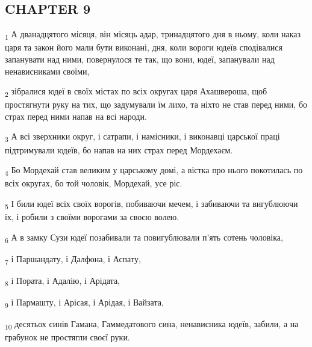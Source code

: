 \subsection{CHAPTER 9}
\begin{tcolorbox}
\textsubscript{1} А дванадцятого місяця, він місяць адар, тринадцятого дня в ньому, коли наказ царя та закон його мали бути виконані, дня, коли вороги юдеїв сподівалися запанувати над ними, повернулося те так, що вони, юдеї, запанували над ненависниками своїми,
\end{tcolorbox}
\begin{tcolorbox}
\textsubscript{2} зібралися юдеї в своїх містах по всіх округах царя Ахашвероша, щоб простягнути руку на тих, що задумували їм лихо, та ніхто не став перед ними, бо страх перед ними напав на всі народи.
\end{tcolorbox}
\begin{tcolorbox}
\textsubscript{3} А всі зверхники округ, і сатрапи, і намісники, і виконавці царської праці підтримували юдеїв, бо напав на них страх перед Мордехаєм.
\end{tcolorbox}
\begin{tcolorbox}
\textsubscript{4} Бо Мордехай став великим у царському домі, а вістка про нього покотилась по всіх округах, бо той чоловік, Мордехай, усе ріс.
\end{tcolorbox}
\begin{tcolorbox}
\textsubscript{5} І били юдеї всіх своїх ворогів, побиваючи мечем, і забиваючи та вигублюючи їх, і робили з своїми ворогами за своєю волею.
\end{tcolorbox}
\begin{tcolorbox}
\textsubscript{6} А в замку Сузи юдеї позабивали та повигублювали п'ять сотень чоловіка,
\end{tcolorbox}
\begin{tcolorbox}
\textsubscript{7} і Паршандату, і Далфона, і Аспату,
\end{tcolorbox}
\begin{tcolorbox}
\textsubscript{8} і Пората, і Адалію, і Арідата,
\end{tcolorbox}
\begin{tcolorbox}
\textsubscript{9} і Пармашту, і Арісая, і Арідая, і Вайзата,
\end{tcolorbox}
\begin{tcolorbox}
\textsubscript{10} десятьох синів Гамана, Гаммедатового сина, ненависника юдеїв, забили, а на грабунок не простягли своєї руки.
\end{tcolorbox}
